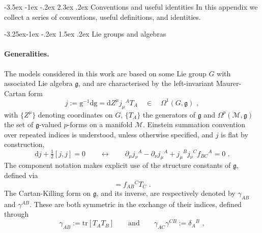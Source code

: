 \documentclass[12pt]{article}
\makeatletter
\renewcommand\section{\@startsection {section}{1}{\z@}%
                                   {-3.5ex \@plus -1ex \@minus -.2ex}%
                                   {2.3ex \@plus.2ex}%
                                   {\normalfont\large\bfseries}}
\renewcommand\subsection{\@startsection{subsection}{2}{\z@}%
                                     {-3.25ex\@plus -1ex \@minus -.2ex}%
                                     {1.5ex \@plus .2ex}%
                                     {\normalfont\bfseries}}
\numberwithin{equation}{section}
\makeatother
\begin{document}
\newpage


\appendix
{}

\section{Conventions and useful identities}\label{appendix:A}
In this appendix we collect a series of conventions, useful definitions, and identities.

\subsection{Lie groups and algebras}

\paragraph{Generalities.} The models considered in this work are based on some Lie group $G$ with associated Lie algebra $\mathfrak{g}$, and are characterised by the left-invariant Maurer-Cartan form 
\begin{equation}\label{MC-form-def}
j:=\mathrm{g^{-1}dg}=\mathrm{d}Z^{\mu}j_{\mu}{}^{A}T_{A}
\quad \in \quad  \Omega^{1}(G,\mathfrak{g}) \,\, ,
\end{equation}
with $\{Z^{\mu}\}$ denoting coordinates on $G$, $\{T_{A}\}$ the generators of $\mathfrak{g}$ and $\Omega^{p}(\mathcal{M},\mathfrak{g})$ the set of $\mathfrak{g}$-valued $p$-forms on a manifold $\mathcal{M}$. Einstein summation convention over repeated indices is understood, unless otherwise specified, and $j$ is flat by construction,
\begin{equation}\label{j-flatness}
\mathrm{d}j+\tfrac{1}{2}[j,j]=0
\qquad \longleftrightarrow \qquad 
\partial_{\mu}j_{\nu}{}^{A}-\partial_{\nu}j_{\mu}{}^{A}+j_{\mu}{}^{B}j_{\nu}{}^{C}f_{BC}{}^{A}=0 \,\, .
\end{equation}
The component notation makes explicit use of the structure constants of $\mathfrak{g}$, defined via
\begin{equation}
[T_{A},T_{B}]=f_{AB}{}^{C}T_{C} \,\, .
\end{equation}
The Cartan-Killing form on $\mathfrak{g}$, and its inverse, are respectively denoted by $\gamma_{AB}$ and $\gamma^{AB}$. These are both symmetric in the exchange of their indices, defined through
\begin{equation}\label{Cartan-Killing-def}
\gamma_{AB}:=\mathrm{tr}[T_{A}T_{B}]
\qquad \text{and} \qquad \gamma_{AC}\gamma^{CB}:=\delta_{A}{}^{B} \,\, ,
\end{equation}
\end{document}
